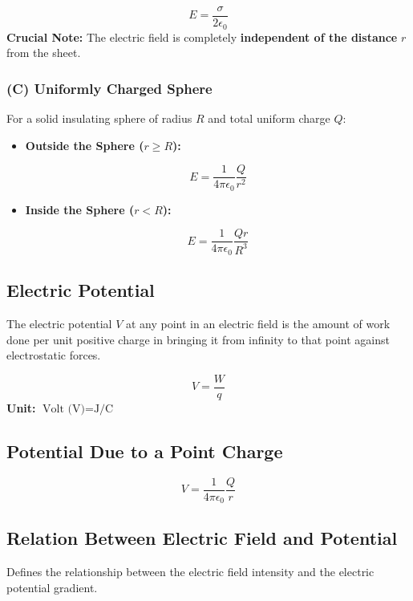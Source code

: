 \documentclass[11pt,a4paper]{article}
\begin{document}
\begin{formulabox}
    \[ E = \frac{\sigma}{2\epsilon_0} \]
    \textbf{Crucial Note:} The electric field is completely \textbf{independent of the distance} $r$ from the sheet.
\end{formulabox}

\subsubsection{(C) Uniformly Charged Sphere}
For a solid insulating sphere of radius $R$ and total uniform charge $Q$:
\begin{itemize}
    \item \textbf{Outside the Sphere ($r \ge R$):}
    \begin{formulabox}
        \[ E = \frac{1}{4\pi\epsilon_0} \frac{Q}{r^2} \]
    \end{formulabox}
    \item \textbf{Inside the Sphere ($r < R$):}
    \begin{formulabox}
        \[ E = \frac{1}{4\pi\epsilon_0} \frac{Qr}{R^3} \]
    \end{formulabox}
\end{itemize}

\subsection{Electric Potential}
The electric potential $V$ at any point in an electric field is the amount of work done per unit positive charge in bringing it from infinity to that point against electrostatic forces.

\begin{formulabox}
    \[ V = \frac{W}{q} \]
    \textbf{Unit:} $\text{Volt (V)} = \text{J/C}$
\end{formulabox}

\subsection{Potential Due to a Point Charge}
\begin{formulabox}
    \[ V = \frac{1}{4\pi\epsilon_0} \frac{Q}{r} \]
\end{formulabox}

\subsection{Relation Between Electric Field and Potential}
\begin{pyqbox}
    Defines the relationship between the electric field intensity and the electric potential gradient.
\end{pyqbox}
\end{document}
